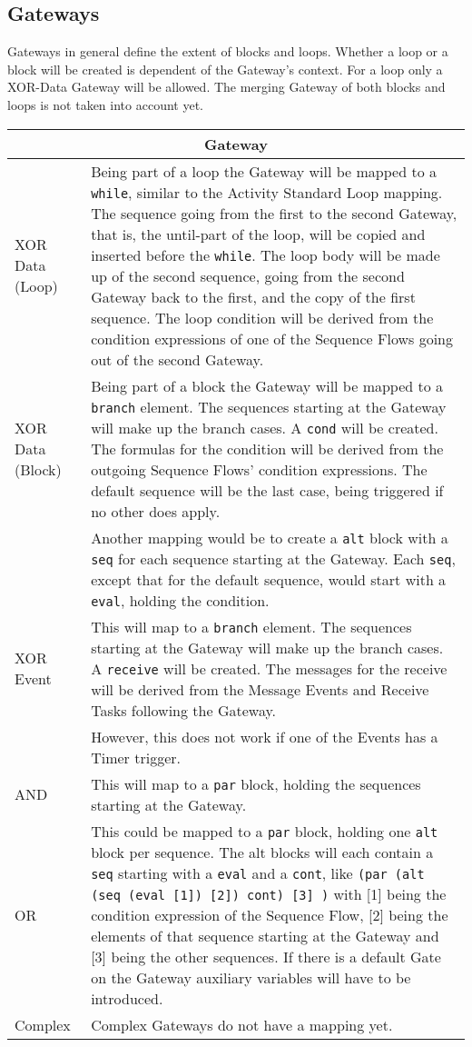 \subsection{Gateways}
Gateways in general define the extent of blocks and loops. Whether a loop or a block will be created is dependent of the Gateway's context. For a loop only a XOR-Data Gateway will be allowed. The merging Gateway of both blocks and loops is not taken into account yet.

\begin{longtable}{|p{3.5cm}|p{10.5cm}|}
\hline
\multicolumn{2}{|c|}{\textbf{Gateway}}
\\\hline
XOR Data (Loop)         & Being part of a loop the Gateway will be mapped to a \verb|while|, similar to the Activity Standard Loop mapping. The sequence going from the first to the second Gateway, that is, the until-part of the loop, will be copied and inserted before the \verb|while|. The loop body will be made up of the second sequence, going from the second Gateway back to the first, and the copy of the first sequence. The loop condition will be derived from the condition expressions of one of the Sequence Flows going out of the second Gateway.
\\\hline
XOR Data (Block)        & Being part of a block the Gateway will be mapped to a \verb|branch| element. The sequences starting at the Gateway will make up the branch cases. A \verb|cond| will be created. The formulas for the condition will be derived from the outgoing Sequence Flows' condition expressions. The default sequence will be the last case, being triggered if no other does apply. \\& Another mapping would be to create a \verb|alt| block with a \verb|seq| for each sequence starting at the Gateway. Each \verb|seq|, except that for the default sequence, would start with a \verb|eval|, holding the condition.
\\\hline
XOR Event               & This will map to a \verb|branch| element. The sequences starting at the Gateway will make up the branch cases. A \verb|receive| will be created. The messages for the receive will be derived from the Message Events and Receive Tasks following the Gateway. \\&
However, this does not work if one of the Events has a Timer trigger.
\\\hline
AND                     & This will map to a \verb|par| block, holding the sequences starting at the Gateway.
\\\hline
OR                      & This could be mapped to a \verb|par| block, holding one \verb|alt| block per sequence. The alt blocks will each contain a \verb|seq| starting with a \verb|eval| and a \verb|cont|, like \verb|(par (alt (seq (eval [1]) [2]) cont) [3] )| with [1] being the condition expression of the Sequence Flow, [2] being the elements of that sequence starting at the Gateway and [3] being the other sequences. If there is a default Gate on the Gateway auxiliary variables will have to be introduced.
\\\hline
Complex                 & Complex Gateways do not have a mapping yet.
\\\hline
\end{longtable}


